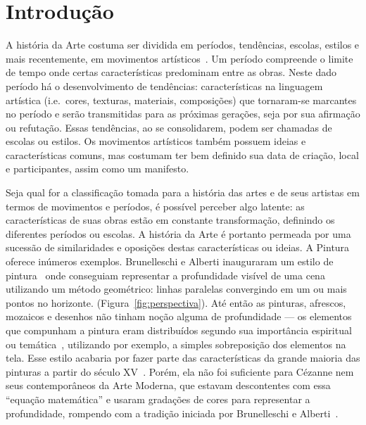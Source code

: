 

\chapter{Introdução}
\label{cap:intro} 

A história da Arte costuma ser dividida em períodos, tendências,
escolas, estilos e mais recentemente, em movimentos
artísticos~\cite{dempsey}. Um período compreende o limite de tempo
onde certas características predominam entre as obras. Neste dado
período há o desenvolvimento de tendências: características na
linguagem artística (i.e.\ cores, texturas, materiais, composições)
que tornaram-se marcantes no período e serão transmitidas para as
próximas gerações, seja por sua afirmação ou refutação. Essas
tendências, ao se consolidarem, podem ser chamadas de escolas ou
estilos. Os movimentos artísticos também possuem ideias e
características comuns, mas costumam ter bem definido sua data de
criação, local e participantes, assim como um manifesto.

Seja qual for a classificação tomada para a história das artes e de
seus artistas em termos de movimentos e períodos, é possível perceber
algo latente: as características de suas obras estão em constante
transformação, definindo os diferentes períodos ou escolas. A história
da Arte é portanto permeada por uma sucessão de similaridades e
oposições destas características ou ideias. A Pintura oferece inúmeros
exemplos. Brunelleschi e Alberti inauguraram um estilo de
pintura~\cite{andersen,kemp} onde conseguiam representar a
profundidade visível de uma cena utilizando um método geométrico:
linhas paralelas convergindo em um ou mais pontos no horizonte.
(Figura~\ref{fig:perspectiva}). Até então as pinturas, afrescos,
mozaicos e desenhos não tinham noção alguma de profundidade --- os
elementos que compunham a pintura eram distribuídos segundo sua
importância espiritual ou temática~\cite{edgerton}, utilizando por
exemplo, a simples sobreposição dos elementos na tela. Esse estilo
acabaria por fazer parte das características da grande maioria das
pinturas a partir do século XV~\cite{gombrich}. Porém, ela não foi
suficiente para Cézanne nem seus contemporâneos da Arte Moderna, que
estavam descontentes com essa ``equação matemática'' e usaram
gradações de cores para representar a profundidade, rompendo com a
tradição iniciada por Brunelleschi e Alberti~\cite{sedlmayr}.

